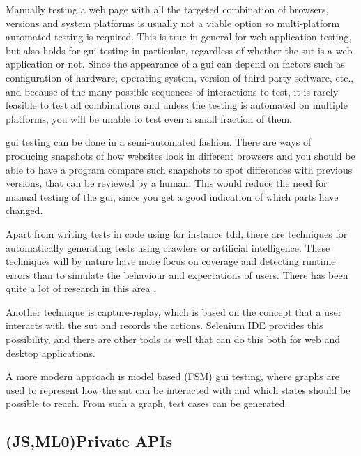 \documentclass[11pt]{article}
\begin{document}
Manually testing a web page with all the targeted combination of browsers, versions and system platforms is usually not a viable option \cite{TestSwarm} so multi-platform automated testing is required. This is true in general for web application testing, but also holds for \gls{gui} testing in particular, regardless of whether the \gls{sut} is a web application or not. Since the appearance of a \gls{gui} can depend on factors such as configuration of hardware, operating system, version of third party software, etc., and because of the many possible sequences of interactions to test, it is rarely feasible to test all combinations and unless the testing is automated on multiple platforms, you will be unable to test even a small fraction of them.

\gls{gui} testing can be done in a semi-automated fashion. There are ways of producing snapshots of how websites look in different browsers and you should be able to have a program compare such snapshots to spot differences with previous versions, that can be reviewed by a human. This would reduce the need for manual testing of the \gls{gui}, since you get a good indication of which parts have changed. %

Apart from writing tests in code using for instance \gls{tdd}, there are techniques for automatically generating tests using crawlers or artificial intelligence. These techniques will by nature have more focus on coverage and detecting runtime errors than to simulate the behaviour and expectations of users. There has been quite a lot of research in this area \cite{AutomatedTesting}\cite{AutomatedAcceptance}\cite{AutomatedAjax}.

Another technique is capture-replay, which is based on the concept that a user interacts with the \gls{sut} and records the actions. Selenium IDE provides this possibility, and there are other tools as well that can do this both for web and desktop applications.

A more modern approach is model based (FSM) \gls{gui} testing, where graphs are used to represent how the \gls{sut} can be interacted with and which states should be possible to reach. From such a graph, test cases can be generated.

\subsection{(JS,ML0)Private APIs}
\end{document}
